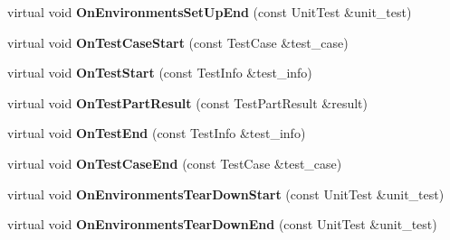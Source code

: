 \begin{DoxyCompactItemize}
\item 
\hypertarget{classtesting_1_1internal_1_1TestEventRepeater_a3a92696df942dc92f985e52fddd6d303}{virtual void {\bfseries On\-Environments\-Set\-Up\-End} (const Unit\-Test \&unit\-\_\-test)}\label{classtesting_1_1internal_1_1TestEventRepeater_a3a92696df942dc92f985e52fddd6d303}

\item 
\hypertarget{classtesting_1_1internal_1_1TestEventRepeater_a70124c738caa338bcd723eb2a51c8b3e}{virtual void {\bfseries On\-Test\-Case\-Start} (const Test\-Case \&test\-\_\-case)}\label{classtesting_1_1internal_1_1TestEventRepeater_a70124c738caa338bcd723eb2a51c8b3e}

\item 
\hypertarget{classtesting_1_1internal_1_1TestEventRepeater_a70d694ca5010cc86cd458f7f529e6fbe}{virtual void {\bfseries On\-Test\-Start} (const Test\-Info \&test\-\_\-info)}\label{classtesting_1_1internal_1_1TestEventRepeater_a70d694ca5010cc86cd458f7f529e6fbe}

\item 
\hypertarget{classtesting_1_1internal_1_1TestEventRepeater_ac8fb21da6802b1ebab9cad3eee9150eb}{virtual void {\bfseries On\-Test\-Part\-Result} (const Test\-Part\-Result \&result)}\label{classtesting_1_1internal_1_1TestEventRepeater_ac8fb21da6802b1ebab9cad3eee9150eb}

\item 
\hypertarget{classtesting_1_1internal_1_1TestEventRepeater_aa0f13bded9369aae1c78583d7276f8b1}{virtual void {\bfseries On\-Test\-End} (const Test\-Info \&test\-\_\-info)}\label{classtesting_1_1internal_1_1TestEventRepeater_aa0f13bded9369aae1c78583d7276f8b1}

\item 
\hypertarget{classtesting_1_1internal_1_1TestEventRepeater_a0a335e1c3957a8c699ed56e37ea7b978}{virtual void {\bfseries On\-Test\-Case\-End} (const Test\-Case \&test\-\_\-case)}\label{classtesting_1_1internal_1_1TestEventRepeater_a0a335e1c3957a8c699ed56e37ea7b978}

\item 
\hypertarget{classtesting_1_1internal_1_1TestEventRepeater_a30db75df2d9a65d787f31e16004613c2}{virtual void {\bfseries On\-Environments\-Tear\-Down\-Start} (const Unit\-Test \&unit\-\_\-test)}\label{classtesting_1_1internal_1_1TestEventRepeater_a30db75df2d9a65d787f31e16004613c2}

\item 
\hypertarget{classtesting_1_1internal_1_1TestEventRepeater_a8428220c4cf9f0cea2dfd9a70f07ab7f}{virtual void {\bfseries On\-Environments\-Tear\-Down\-End} (const Unit\-Test \&unit\-\_\-test)}\label{classtesting_1_1internal_1_1TestEventRepeater_a8428220c4cf9f0cea2dfd9a70f07ab7f}


\end{DoxyCompactItemize}
